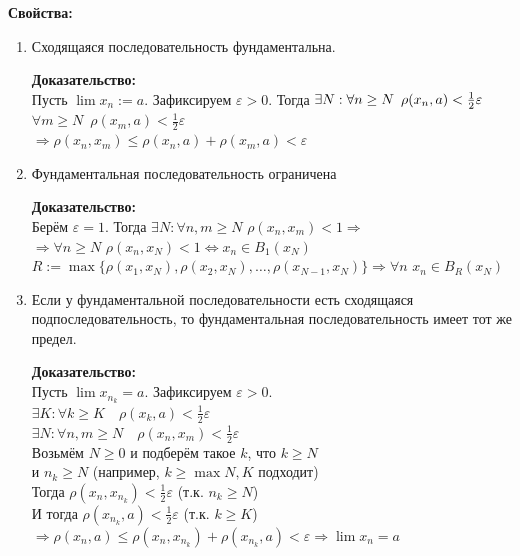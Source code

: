 \documentclass[12pt,letterpaper]{report}
\theoremstyle{definition}
\begin{document}
    \textbf{Свойства:}
    \begin{enumerate}
        \item Сходящаяся последовательность фундаментальна.
        
        \textbf{Доказательство:}\\
        Пусть $\lim x_n := a$. Зафиксируем $\varepsilon > 0$.
        Тогда $\exists N :\\ \forall n \geq N \,\,\, \rho(x_n, a) < 
        \frac{1}{2} \varepsilon$\\ 
        $\forall m \geq N \,\,\, \rho(x_m, a) < \frac{1}{2} \varepsilon$\\
        $\Rightarrow \rho(x_n, x_m) \leq \rho(x_n, a) + \rho(x_m, a) <
        \varepsilon$
    
        \item Фундаментальная последовательность ограничена
        
        \textbf{Доказательство:}\\
        Берём $\varepsilon = 1$. Тогда $\exists N : \forall n, m \geq N \,\,
        \rho(x_n, x_m) < 1 \Rightarrow$\\
        $\Rightarrow \forall n \geq N \,\, \rho(x_n, x_N) < 1
        \Leftrightarrow x_n \in B_1(x_N)$\\
        $R := \max\{\rho(x_1, x_N), \rho(x_2, x_N), \dots, 
        \rho(x_{N-1}, x_N)\} \Rightarrow \forall n \,\, x_n \in B_R(x_N)$
    
        \item Если у фундаментальной последовательности есть сходящаяся
        подпоследовательность, то фундаментальная последовательность
        имеет тот же предел.
    
        \textbf{Доказательство:}\\
        Пусть $\lim x_{n_k} = a$. Зафиксируем $\varepsilon > 0$.\\
        $\exists K : \forall k \geq K \quad \rho(x_k, a) <
        \frac{1}{2} \varepsilon$\\
        $\exists N : \forall n, m \geq N \quad \rho(x_n, x_m) <
        \frac{1}{2} \varepsilon$\\
        Возьмём $N \geq 0$ и подберём такое $k$, что $k \geq N$\\
        и $n_k \geq N$ (например, $k \geq \max{N, K}$ подходит)\\
        Тогда $\rho(x_n, x_{n_k}) < \frac{1}{2} \varepsilon$
        (т.к. $n_k \geq N$)\\
        И тогда $\rho(x_{n_k}, a) < \frac{1}{2} \varepsilon$
        (т.к. $k \geq K$)\\
        $\Rightarrow \rho(x_n, a) \leq \rho(x_n, x_{n_k}) +
        \rho(x_{n_k}, a) < \varepsilon \Rightarrow \lim x_n = a$
    \end{enumerate}
    
\end{document}
